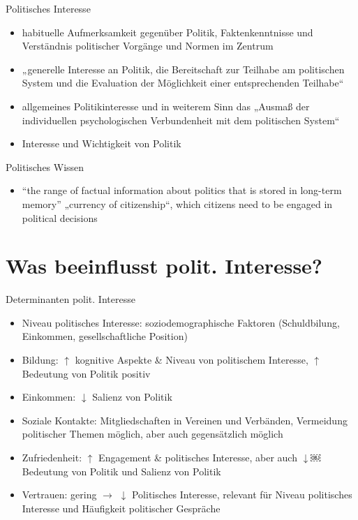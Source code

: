 \documentclass[11pt]{beamer}
\begin{document}
\begin{frame}[t]{Politisches Interesse}
			\begin{itemize}
				\item habituelle Aufmerksamkeit gegenüber Politik, Faktenkenntnisse und Verständnis politischer Vorgänge und Normen im Zentrum \parencite{Zaller1992}
				\item „generelle Interesse an Politik, die Bereitschaft zur Teilhabe am politischen System und die Evaluation der Möglichkeit einer entsprechenden Teilhabe“ \parencite[72]{Pickel2002}
				\item allgemeines Politikinteresse und in weiterem Sinn das „Ausmaß der individuellen psychologischen Verbundenheit mit dem politischen System“ \parencite[72f]{Caballero2009}
				\item Interesse und Wichtigkeit von Politik \parencite{Martin2007}
			\end{itemize}
\end{frame}


\begin{frame}{Politisches Wissen}
	\begin{itemize}
		\item “the range of factual information about politics that is stored in long-term memory” \parencite[10]{DelliCarpini1996}
„currency of citizenship“, which citizens need to be engaged in political decisions \parencite[8]{DelliCarpini1996}
	\end{itemize}
\end{frame}

\section{Was beeinflusst polit. Interesse?}

\begin{frame}{Determinanten polit. Interesse \parencite{vanDeth2004}}
	\begin{itemize}
		\item	Niveau politisches Interesse: soziodemographische Faktoren (Schuldbilung, Einkommen, gesellschaftliche Position)
		\item Bildung: $\uparrow$ kognitive Aspekte \& Niveau von politischem Interesse, $\uparrow$ Bedeutung von Politik positiv
		\item Einkommen: $\downarrow$ Salienz von Politik
		\item Soziale Kontakte: Mitgliedschaften in Vereinen und Verbänden, Vermeidung politischer Themen möglich, aber auch gegensätzlich möglich
		\item Zufriedenheit: $\uparrow$ Engagement \& politisches Interesse, aber auch $\downarrow$￼ Bedeutung von Politik und Salienz von Politik
		\item Vertrauen: gering $\rightarrow$ $\downarrow$ Politisches Interesse, relevant für Niveau politisches Interesse und Häufigkeit politischer Gespräche
	\end{itemize}
\end{frame}
\end{document}
